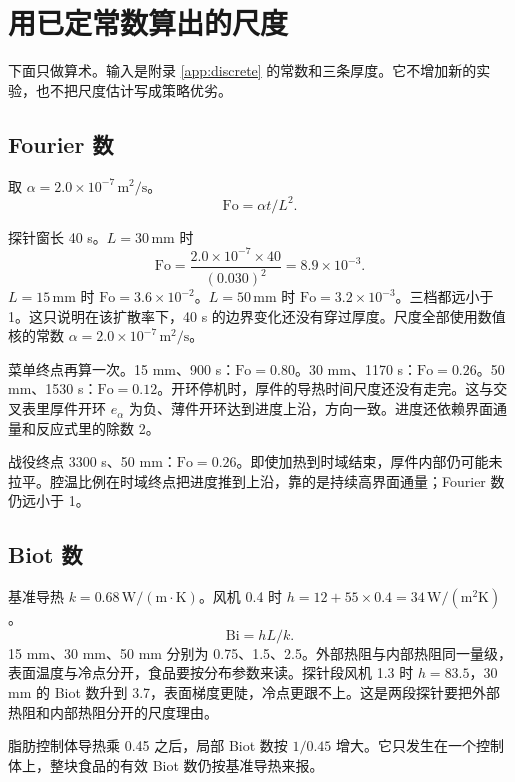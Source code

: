\chapter{用已定常数算出的尺度}
\label{app:scales}

下面只做算术。输入是附录 \ref{app:discrete} 的常数和三条厚度。它不增加新的实验，也不把尺度估计写成策略优劣。

\section{Fourier 数}

取 \(\alpha=2.0\times 10^{-7}\,\mathrm{m}^2/\mathrm{s}\)。
\begin{equation}
\mathrm{Fo}=\alpha t/L^2.
\end{equation}

探针窗长 40 s。\(L=30\,\mathrm{mm}\) 时
\[
\mathrm{Fo}=\frac{2.0\times 10^{-7}\times 40}{(0.030)^2}=8.9\times 10^{-3}.
\]
\(L=15\,\mathrm{mm}\) 时 \(\mathrm{Fo}=3.6\times 10^{-2}\)。\(L=50\,\mathrm{mm}\) 时 \(\mathrm{Fo}=3.2\times 10^{-3}\)。三档都远小于 1。这只说明在该扩散率下，40 s 的边界变化还没有穿过厚度。尺度全部使用数值核的常数 \(\alpha=2.0\times 10^{-7}\,\mathrm{m}^2/\mathrm{s}\)。

菜单终点再算一次。15 mm、900 s：\(\mathrm{Fo}=0.80\)。30 mm、1170 s：\(\mathrm{Fo}=0.26\)。50 mm、1530 s：\(\mathrm{Fo}=0.12\)。开环停机时，厚件的导热时间尺度还没有走完。这与交叉表里厚件开环 \(e_{\alpha}\) 为负、薄件开环达到进度上沿，方向一致。进度还依赖界面通量和反应式里的除数 2。

战役终点 3300 s、50 mm：\(\mathrm{Fo}=0.26\)。即使加热到时域结束，厚件内部仍可能未拉平。腔温比例在时域终点把进度推到上沿，靠的是持续高界面通量；Fourier 数仍远小于 1。

\section{Biot 数}

基准导热 \(k=0.68\,\mathrm{W}/(\mathrm{m\cdot K})\)。风机 0.4 时 \(h=12+55\times 0.4=34\,\mathrm{W}/(\mathrm{m}^2\mathrm{K})\)。
\begin{equation}
\mathrm{Bi}=hL/k.
\end{equation}
15 mm、30 mm、50 mm 分别为 0.75、1.5、2.5。外部热阻与内部热阻同一量级，表面温度与冷点分开，食品要按分布参数来读。探针段风机 1.3 时 \(h=83.5\)，30 mm 的 Biot 数升到 3.7，表面梯度更陡，冷点更跟不上。这是两段探针要把外部热阻和内部热阻分开的尺度理由。

脂肪控制体导热乘 0.45 之后，局部 Biot 数按 \(1/0.45\) 增大。它只发生在一个控制体上，整块食品的有效 Biot 数仍按基准导热来报。

